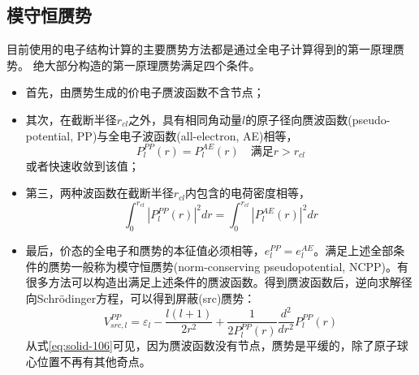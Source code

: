 \subsection{模守恒赝势}
目前使用的电子结构计算的主要赝势方法都是通过全电子计算得到的第一原理赝势。%
绝大部分构造的第一原理赝势满足四个条件\cite{PRB12-4200_1975,PRB18-5449_1978,PRB19-568_1979,PRB20-4082_1979,PRB26-4199_1982,PRL43-1494_1979,JPC13-L189_1980,PRB32-8412_1985,PRB43-1993_1991}。
\begin{itemize}
	\item 首先，由赝势生成的价电子赝波函数不含节点；
	\item 其次，在截断半径$r_{cl}$之外\cite{JPC13-L189_1980,PRB43-1993_1991}，具有相同角动量$l$的原子径向赝波函数(pseudo-potential, PP)与全电子波函数(all-electron, AE)相等，%
\begin{equation}
  P_l^{PP}(r)=P_l^{AE}(r)\quad \mbox{满足}r>r_{cl}
  \label{eq:solid-104}
\end{equation}
或者快速收敛到该值\cite{PRB18-5449_1978,PRL43-1494_1979,PRB32-8412_1985}；
	\item 第三，两种波函数在截断半径$r_{cl}$内包含的电荷密度相等\cite{PRL43-1494_1979,PRB43-1993_1991}，
\begin{equation}
  \int_0^{r_{cl}}|P_l^{PP}(r)|^2dr=\int_0^{r_{cl}}|P_l^{AE}(r)|^2dr
  \label{eq:solid-105}
\end{equation}
	\item 最后，价态的全电子和赝势的本征值必须相等，$e_l^{PP}=e_l^{AE}$。满足上述全部条件的赝势一般称为模守恒赝势(norm-conserving pseudopotential, NCPP)\cite{PRL43-1494_1979}。有很多方法可以构造出满足上述条件的赝波函数\cite{PRB18-5449_1978,PRB26-4199_1982,PRL43-1494_1979,JPC13-L189_1980,PRB32-8412_1985,PRB43-1993_1991}。得到赝波函数后，逆向求解径向Schr\"odinger方程，可以得到屏蔽(src)赝势：
\begin{equation}
  V_{src,l}^{PP}=\varepsilon_l-\frac{l(l+1)}{2r^2}+\frac1{2P_l^{PP}(r)}\frac{d^2}{dr^2}P_l^{PP}(r)
  \label{eq:solid-106}
\end{equation}
从式\eqref{eq:solid-106}可见，因为赝波函数没有节点，赝势是平缓的，除了原子球心位置不再有其他奇点。
\end{itemize}
